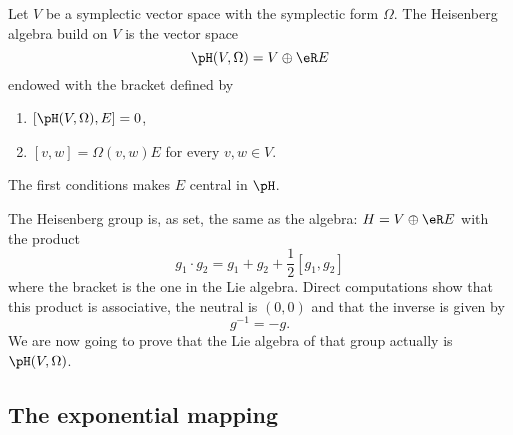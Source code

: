 Let $V$ be a symplectic vector space with the symplectic form $\Omega$. The \hypertarget{HyperHeisenberg}{Heisenberg algebra} build on $V$ is the vector space
\begin{equation}
	\pH(V,\Omega)=V\oplus \eR E
\end{equation}
endowed with the bracket defined by
\begin{enumerate}

	\item
		$[\pH(V,\Omega),E]=0$,
	\item
		$[v,w]=\Omega(v,w)E$ for every $v,w\in V$.

\end{enumerate}
The first conditions makes $E$ central in $\pH$.

The Heisenberg group is, as set, the same as the algebra: $H=V\oplus\eR E$ with the product
\begin{equation}		\label{EqProduitHeisenbergGp}
	g_1\cdot g_2=g_1+g_2+\frac{ 1 }{2}[g_1,g_2]
\end{equation}
where the bracket is the one in the Lie algebra. Direct computations show that this product is associative, the neutral is $(0,0)$ and that the inverse is given by
\begin{equation}
	g^{-1}=-g.
\end{equation}
We are now going to prove that the Lie algebra of that group actually is $\pH(V,\Omega)$.

\subsection{The exponential mapping}


